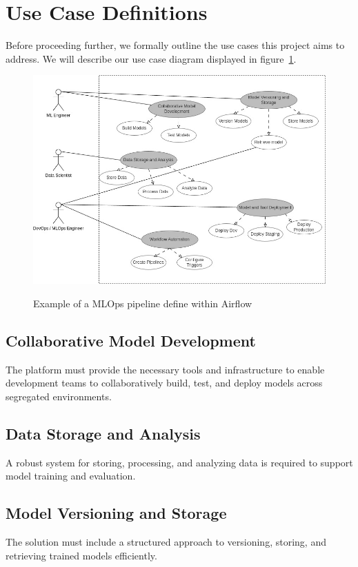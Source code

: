 \section{Use Case Definitions}\label{sec:use-case-definitions}
Before proceeding further, we formally outline the use cases this project aims to address.
We will describe our use case diagram displayed in figure~\ref{fig:usecases}.

\begin{figure}[!htbp]
    \centering
    \caption{Example of a MLOps pipeline define within Airflow}
    \includegraphics[scale=0.5]{images/project/usecases}
    \label{fig:usecases}
\end{figure}

\subsection{Collaborative Model Development}\label{subsec:collaborative-model-development}
The platform must provide the necessary tools and infrastructure to enable development teams to collaboratively build,
test, and deploy models across segregated environments.

\subsection{Data Storage and Analysis}\label{subsec:data-storage-and-analysis}
A robust system for storing, processing, and analyzing data is required to support model training and evaluation.

\subsection{Model Versioning and Storage}\label{subsec:model-versioning-and-storage}
The solution must include a structured approach to versioning, storing, and retrieving trained models efficiently.

